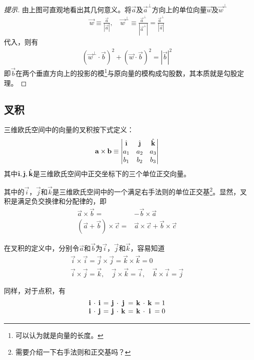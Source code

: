 \begin{proof}[提示]
  由上图可直观地看出其几何意义。将$\vec a$及$\vec a^\perp$方向上的单位向量$\vec w$及$\vec w^\perp$
  \begin{align*}
    \vec w\equiv \frac{\vec a}{|\vec a|},\quad
    \vec w^\perp\equiv\frac{\vec a^\perp}{|\vec a^\perp|}=\frac{\vec a^\perp}{|\vec a|}
  \end{align*}
  代入，则有
  \begin{align*}
    (\vec w^\perp\cdot\vec b)^2 + (\vec w\cdot \vec b)^2 = |\vec b|^2
  \end{align*}
  即$\vec b$在两个垂直方向上的投影的模\footnote{可以认为就是向量的长度。}与原向量的模构成勾股数，其本质就是勾股定理。
\end{proof}


\subsection{叉积}
\label{sec:cross-product-of-vector}
\begin{definition}
  三维欧氏空间中的向量的叉积按下式定义：
  \begin{align*}
    \vec{a}\times\vec{b}\equiv
    \begin{vmatrix}
      \ihat  & \jhat  & \khat\\
      a_1    & a_2    & a_3\\
      b_1    & b_2    & b_3
    \end{vmatrix}
  \end{align*}
  其中$\ihat, \jhat, \khat$是三维欧氏空间中正交坐标下的三个单位正交向量。
\end{definition}
其中的$\vec i$，$\vec j$和$\vec k$是三维欧氏空间中的一个满足右手法则的单位正交基\footnote{\color{red}需要介绍一下右手法则和正交基吗？}。显然，叉积是满足负交换律和分配律的，即
\begin{align*}
  \vec a\times \vec b ={}& - \vec b\times \vec a\\
  (\vec a + \vec b)\times \vec c ={}& \vec a\times \vec c + \vec b\times \vec c
\end{align*}

\begin{example}
  在叉积的定义中，分别令$\vec a$和$\vec b$为$\vec i$，$\vec j$和$\vec k$，容易知道
  \begin{gather*}
    \vec i \times \vec i = \vec j\times \vec j=\vec k\times \vec k = 0\\
    \vec i\times \vec j = \vec k,\quad \vec j\times \vec k = \vec i,\quad \vec k\times \vec i = \vec j
  \end{gather*}

  同样，对于点积，有
  \begin{gather*}\setlength\arraycolsep{2pt}\renewcommand*{\arraystretch}{1.0}
    \begin{array}{cccccccccccc}
      \vec i & \cdot & \vec i & = & \vec j & \cdot & \vec j & = & \vec k & \cdot & \vec k & = 1\\
      \vec i & \cdot & \vec j & = & \vec j & \cdot & \vec k & = & \vec k & \cdot & \vec i & = 0
    \end{array}
  \end{gather*}
\end{example}

